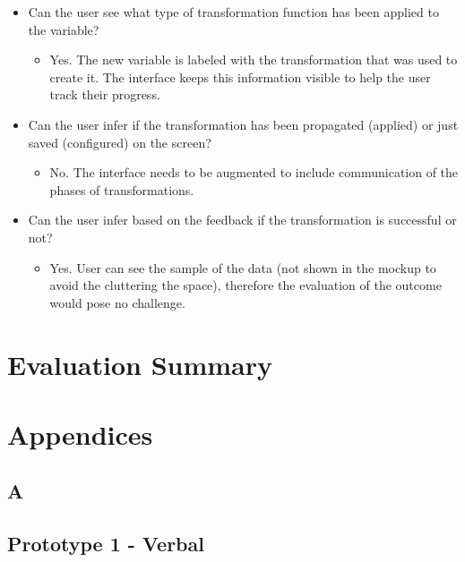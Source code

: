 \documentclass[12pt,letterpaper]{article}
\begin{document}
\begin{itemize}
\begin{itemize}
\begin{itemize}
        \end{itemize}
        \item Can the user see what type of transformation function has been applied to the variable?
        \begin{itemize}
                \item Yes. The new variable is labeled with the transformation that was used to create it. The interface keeps this information visible to help the user track their progress.
        \end{itemize}
        \item Can the user infer if the transformation has been propagated (applied) or just saved (configured) on the screen?
        \begin{itemize}
                \item No. The interface needs to be augmented to include communication of the phases of transformations. 
        \end{itemize}
        \item Can the user infer based on the feedback if the transformation is successful or not?
        \begin{itemize}
                \item Yes. User can see the sample of the data (not shown in the mockup to avoid the cluttering the space), therefore the evaluation of the outcome would pose no challenge. 
        \end{itemize}
    \end{itemize}
\end{itemize}


\section*{Evaluation Summary}

 

 


\newpage
\section*{Appendices}

\appendix


\subsection*{A}

\subsection*{Prototype 1 - Verbal}
\end{document}
